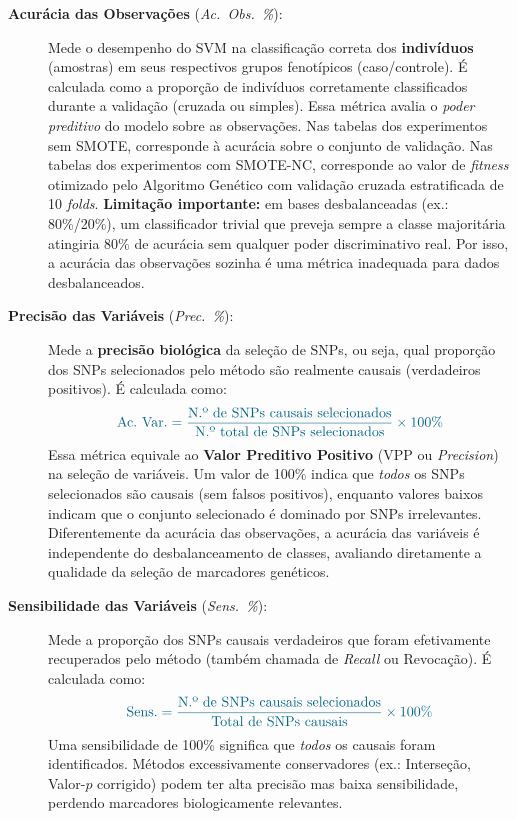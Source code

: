 \documentclass[
    12pt,
    a4paper,
    oneside,
    english,
    french,
    spanish,
    brazil
    ]{abntex2}
\newcommand{\novo}[1]{\textcolor{corNova}{#1}}
\begin{document}
\begin{description}
  \item[\novo{\textbf{Acurácia das Observações} (\textit{Ac.\ Obs.\ \%}):}]
  \novo{Mede o desempenho do SVM na classificação correta dos \textbf{indivíduos} (amostras) em seus respectivos grupos fenotípicos (caso/controle). É calculada como a proporção de indivíduos corretamente classificados durante a validação (cruzada ou simples). Essa métrica avalia o \emph{poder preditivo} do modelo sobre as observações. Nas tabelas dos experimentos sem SMOTE, corresponde à acurácia sobre o conjunto de validação. Nas tabelas dos experimentos com SMOTE-NC, corresponde ao valor de \textit{fitness} otimizado pelo Algoritmo Genético com validação cruzada estratificada de 10 \textit{folds}. \textbf{Limitação importante:} em bases desbalanceadas (ex.: 80\%/20\%), um classificador trivial que preveja sempre a classe majoritária atingiria 80\% de acurácia sem qualquer poder discriminativo real. Por isso, a acurácia das observações sozinha é uma métrica inadequada para dados desbalanceados.}

  \item[\novo{\textbf{Precisão das Variáveis} (\textit{Prec.\ \%}):}]
  \novo{Mede a \textbf{precisão biológica} da seleção de SNPs, ou seja, qual proporção dos SNPs selecionados pelo método são realmente causais (verdadeiros positivos). É calculada como:}
  \begin{equation}
    \novo{\text{Ac.\ Var.} = \frac{\text{N.º de SNPs causais selecionados}}{\text{N.º total de SNPs selecionados}} \times 100\%}
  \label{eq:precisao}
  \end{equation}
  \novo{Essa métrica equivale ao \textbf{Valor Preditivo Positivo} (VPP ou \textit{Precision}) na seleção de variáveis. Um valor de 100\% indica que \emph{todos} os SNPs selecionados são causais (sem falsos positivos), enquanto valores baixos indicam que o conjunto selecionado é dominado por SNPs irrelevantes. Diferentemente da acurácia das observações, a acurácia das variáveis é independente do desbalanceamento de classes, avaliando diretamente a qualidade da seleção de marcadores genéticos.}

  \item[\novo{\textbf{Sensibilidade das Variáveis} (\textit{Sens.\ \%}):}]
  \novo{Mede a proporção dos SNPs causais verdadeiros que foram efetivamente recuperados pelo método (também chamada de \textit{Recall} ou Revocação). É calculada como:}
  \begin{equation}
    \novo{\text{Sens.} = \frac{\text{N.º de SNPs causais selecionados}}{\text{Total de SNPs causais}} \times 100\%}
  \label{eq:sensibilidade}
  \end{equation}
  \novo{Uma sensibilidade de 100\% significa que \emph{todos} os causais foram identificados. Métodos excessivamente conservadores (ex.: Interseção, Valor-$p$ corrigido) podem ter alta precisão mas baixa sensibilidade, perdendo marcadores biologicamente relevantes.}


\end{description}
\end{document}
